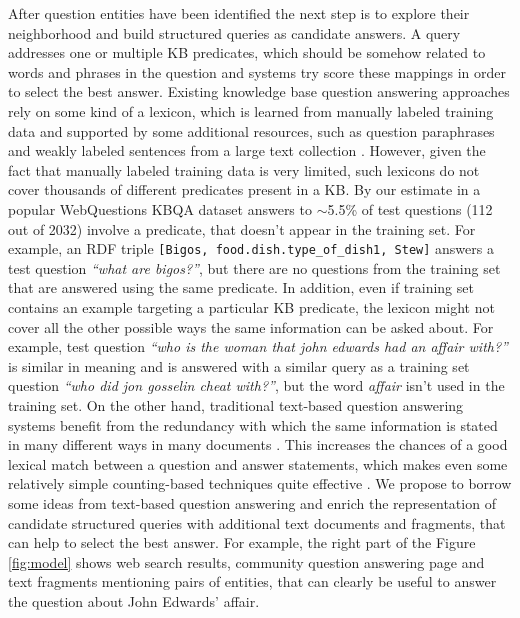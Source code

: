 After question entities have been identified the next step is to explore their neighborhood and build structured queries as candidate answers.
A query addresses one or multiple KB predicates, which should be somehow related to words and phrases in the question and systems try score these mappings in order to select the best answer.
Existing knowledge base question answering approaches \cite{ACCU:2015,Berant:EMNLP13,berant2014semantic,berant2015imitation,BordesCW14:emnlp,yao2014freebase} rely on some kind of a lexicon, which is learned from manually labeled training data and supported by some additional resources, such as question paraphrases \cite{berant2014semantic} and weakly labeled sentences from a large text collection \cite{yao2014information}.
However, given the fact that manually labeled training data is very limited, such lexicons do not cover thousands of different predicates present in a KB.
By our estimate in a popular WebQuestions KBQA dataset answers to $\sim$5.5\% of test questions (112 out of 2032) involve a predicate, that doesn't appear in the training set.
For example, an RDF triple \texttt{[Bigos, food.dish.type\_of\_dish1, Stew]} answers a test question \textit{``what are bigos?''}, but there are no questions from the training set that are answered using the same predicate.
In addition, even if training set contains an example targeting a particular KB predicate, the lexicon might not cover all the other possible ways the same information can be asked about.
For example, test question \textit{``who is the woman that john edwards had an affair with?''} is similar in meaning and is answered with a similar query as a training set question \textit{``who did jon gosselin cheat with?''}, but the word \textit{affair} isn't used in the training set.
On the other hand, traditional text-based question answering systems benefit from the redundancy with which the same information is stated in many different ways in many documents \cite{Lin:2007:EPU:1229179.1229180}.
This increases the chances of a good lexical match between a question and answer statements, which makes even some relatively simple counting-based techniques quite effective \cite{brill2002analysis}.
We propose to borrow some ideas from text-based question answering and enrich the representation of candidate structured queries with additional text documents and fragments, that can help to select the best answer.
For example, the right part of the Figure \ref{fig:model} shows web search results, community question answering page and text fragments mentioning pairs of entities, that can clearly be useful to answer the question about John Edwards' affair.

